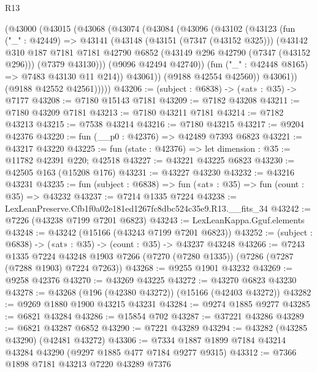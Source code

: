 \begin{lexlean}{R13}
\begin{coremodule}
        (@43000
          (@43015
            (@43068
              (@43074
                (@43084
                  (@43096
                    (@43102
                      (@43123
                        (fun ("_" : @42449) =>
                        @43141
                          (@43148
                            (@43151 (@7347 (@43152 @325)))
                            (@43142
                              @310
                              @187
                              @7181
                              @7181
                              @42790
                              @6852
                              (@43149 @296 @42790 (@7347 (@43152 @296)))
                              (@7379 @43130)))
                          (@9096 @42494 @42740))
                        (fun ("_" : @42448 @8165) => @7483 @43130 @11 @214))
                      @43061))
                  (@9188 @42554 @42560))
                @43061))
            (@9188 @42552 @42561)))))
@43206 := (subject : @6838) -> («at» : @35) -> @7177
@43208 := @7180 @15143 @7181
@43209 := @7182 @43208
@43211 := @7180 @43209 @7181
@43213 := @7180 @43211 @7181
@43214 := @7182 @43213
@43215 := @7538 @43214
@43216 := @7180 @43215
@43217 := @9204 @42376
@43220 := fun (__p0 : @42376) => @42489 @7393 @6823
@43221 := @43217 @43220
@43225 := fun (state : @42376) => let dimension : @35 := @11782 @42391 @220; @42518
@43227 := @43221 @43225 @6823
@43230 := @42505 @163 (@15208 @176)
@43231 := @43227 @43230
@43232 := @43216 @43231
@43235 := fun (subject : @6838) => fun («at» : @35) => fun (count : @35) => @43232
@43237 := @7214 @1335 @7224
@43238 := LexLeanPreserve.Cfb1f0a02e181ed1267fc8dbc524c35e9.R13.__fits_34
@43242 := @7226 (@43238 @7199 @7201 @6823)
@43243 := LexLeanKappa.Gguf.elements
@43248 := @43242 (@15166 (@43243 @7199 @7201 @6823))
@43252 := (subject : @6838) -> («at» : @35) -> (count : @35) -> @43237 @43248
@43266 := @7243
    @1335
    @7224
    @43248
    @1903
    @7266
    (@7270 (@7280 @1335))
    (@7286 (@7287 (@7288 @1903) @7224 @7263))
@43268 := @9255 @1901 @43232
@43269 := @9258 @42376
@43270 := @43269 @43225
@43272 := @43270 @6823 @43230
@43278 := @43268 (@196 (@42380 @43272)) (@15166 (@42403 @43272))
@43282 := @9269 @1880 @1900 @43215 @43231
@43284 := @9274 @1885 @9277
@43285 := @6821 @43284
@43286 := @15854 @702
@43287 := @37221 @43286
@43289 := @6821 @43287 @6852
@43290 := @7221 @43289
@43294 := @43282 (@43285 @43290) (@42481 @43272)
@43306 := @7334 @1887 @1899 @7184 @43214 @43284 @43290 (@9297 @1885 @477 @7184 @9277 @9315)
@43312 := @7366 @1898 @7181 @43213 @7220 @43289 @7376

\end{coremodule}
\end{lexlean}
